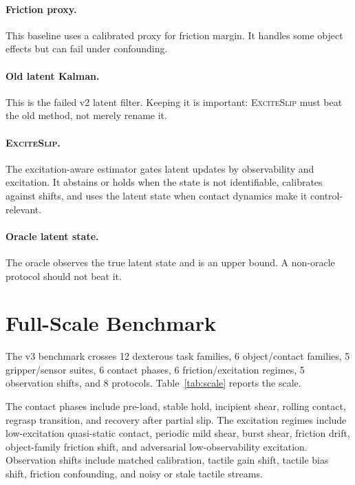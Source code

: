 \documentclass{article}
\newcommand{\method}{\textsc{ExciteSlip}\xspace}
\begin{document}
\paragraph{Friction proxy.}
This baseline uses a calibrated proxy for friction margin. It handles some object effects but can fail under confounding.

\paragraph{Old latent Kalman.}
This is the failed v2 latent filter. Keeping it is important: \method must beat the old method, not merely rename it.

\paragraph{\method.}
The excitation-aware estimator gates latent updates by observability and excitation. It abstains or holds when the state is not identifiable, calibrates against shifts, and uses the latent state when contact dynamics make it control-relevant.

\paragraph{Oracle latent state.}
The oracle observes the true latent state and is an upper bound. A non-oracle protocol should not beat it.

\section{Full-Scale Benchmark}

The v3 benchmark crosses 12 dexterous task families, 6 object/contact families, 5 gripper/sensor suites, 6 contact phases, 6 friction/excitation regimes, 5 observation shifts, and 8 protocols. Table~\ref{tab:scale} reports the scale.

\begin{table}[t]
\centering
\caption{Full-scale benchmark size. The CSV stores compact rows; each row represents repeated seeds, objects, grasps, calibrations, disturbances, trials, and frames.}
\label{tab:scale}

\end{table}

The contact phases include pre-load, stable hold, incipient shear, rolling contact, regrasp transition, and recovery after partial slip. The excitation regimes include low-excitation quasi-static contact, periodic mild shear, burst shear, friction drift, object-family friction shift, and adversarial low-observability excitation. Observation shifts include matched calibration, tactile gain shift, tactile bias shift, friction confounding, and noisy or stale tactile streams.
\end{document}
